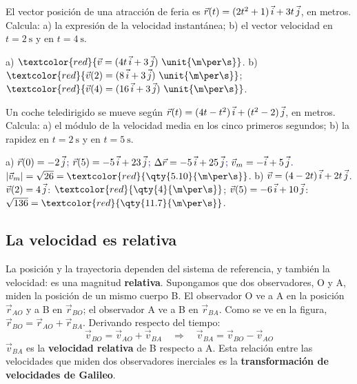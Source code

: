 \begin{exercise}
    El vector posición de una atracción de feria es \(\vec r(t) = (2t^2 + 1)\,\vec{i} + 3t\,\vec{j}\), en metros. Calcula: a) la
    expresión de la velocidad instantánea; b) el vector velocidad en \(t = \qty{2}{\s}\) y en \(t = \qty{4}{\s}\).
    \begin{solu}
        a) \(\textcolor{red}{\vec v = (4t\,\ivec + 3\,\jvec)~\unit{\m\per\s}}\). b) \(\textcolor{red}{\vec v(2) = (8\,\ivec + 3\,\jvec)~\unit{\m\per\s}}\);
        \(\textcolor{red}{\vec v(4) = (16\,\ivec + 3\,\jvec)~\unit{\m\per\s}}\).
    \end{solu}
\end{exercise}

\begin{exercise}
    Un coche teledirigido se mueve según \(\vec r(t) = (4t - t^2)\,\vec{i} + (t^2 - 2)\,\vec{j}\), en metros. Calcula: a) el módulo de
    la velocidad media en los cinco primeros segundos; b) la rapidez en \(t = \qty{2}{\s}\) y en \(t = \qty{5}{\s}\).
    \begin{solu}
        a) \textcolor{blue}{\(\vec r(0) = -2\,\vec{j}\); \(\vec r(5) = -5\,\vec{i} + 23\,\vec{j}\); \(\Delta\vec r = -5\,\vec{i} + 25\,\vec{j}\);
        \(\vec v_m = -\vec{i} + 5\,\vec{j}\).} \(|\vec v_m| = \sqrt{26} = \textcolor{red}{\qty{5.10}{\m\per\s}}\).
        b) \textcolor{blue}{\(\vec v = (4 - 2t)\,\vec{i} + 2t\,\vec{j}\).} \(\vec v(2) = 4\,\vec{j}\): \(\textcolor{red}{\qty{4}{\m\per\s}}\);
        \(\vec v(5) = -6\,\vec{i} + 10\,\vec{j}\): \(\sqrt{136} = \textcolor{red}{\qty{11.7}{\m\per\s}}\).
    \end{solu}
\end{exercise}

\subsection{La velocidad es relativa}

La posición y la trayectoria dependen del sistema de referencia, y también la velocidad: es una magnitud \textbf{relativa}.
Supongamos que dos observadores, O y A, miden la posición de un mismo cuerpo B. El observador O ve a A en la posición
\(\vec r_{AO}\) y a B en \(\vec r_{BO}\); el observador A ve a B en \(\vec r_{BA}\). Como se ve en la figura, \(\vec r_{BO} =
\vec r_{AO} + \vec r_{BA}\). Derivando respecto del tiempo:
\[ \vec v_{BO} = \vec v_{AO} + \vec v_{BA} \quad\Rightarrow\quad \boxed{\vec v_{BA} = \vec v_{BO} - \vec v_{AO}} \]
\(\vec v_{BA}\) es la \textbf{velocidad relativa} de B respecto a A. Esta relación entre las velocidades que miden dos observadores
inerciales es la \textbf{transformación de velocidades de Galileo}.

